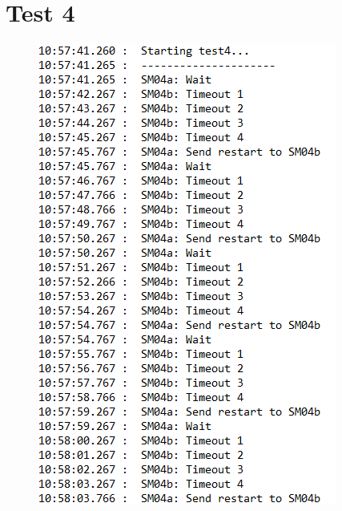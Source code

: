 \documentclass[11pt,titlepage]{report}
\begin{document}
\section{Test 4}
\begin{figure}[H]
	\centering
	\includegraphics[]{Images/tests/test4.PNG}
\end{figure}
\end{document}
